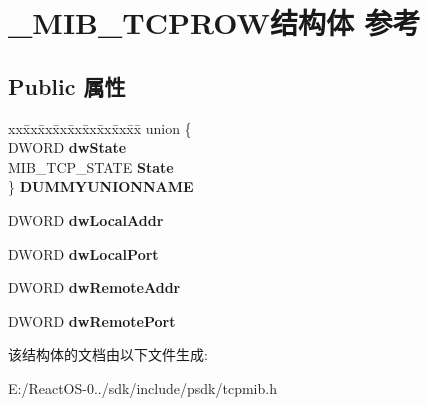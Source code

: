 \hypertarget{struct___m_i_b___t_c_p_r_o_w}{}\section{\+\_\+\+M\+I\+B\+\_\+\+T\+C\+P\+R\+O\+W结构体 参考}
\label{struct___m_i_b___t_c_p_r_o_w}
\subsection*{Public 属性}
\begin{DoxyCompactItemize}
\item 
\mbox{\label{struct___m_i_b___t_c_p_r_o_w_a27cc0d14fdf20faf8d3ce1b8f2ab7068}} 
\begin{tabbing}
xx\=xx\=xx\=xx\=xx\=xx\=xx\=xx\=xx\=\kill
union \{\\
\>DWORD {\bfseries dwState}\\
\>MIB\_TCP\_STATE {\bfseries State}\\
\} {\bfseries DUMMYUNIONNAME}\\

\end{tabbing}\item 
\mbox{\label{struct___m_i_b___t_c_p_r_o_w_a7a7d3f4f24ca85a1f619d1c91adde281}} 
D\+W\+O\+RD {\bfseries dw\+Local\+Addr}
\item 
\mbox{\label{struct___m_i_b___t_c_p_r_o_w_a59f02fad2945a8bf311879cb6b13f12c}} 
D\+W\+O\+RD {\bfseries dw\+Local\+Port}
\item 
\mbox{\label{struct___m_i_b___t_c_p_r_o_w_aa9d4f3d0a660e81ce11f23ff04851683}} 
D\+W\+O\+RD {\bfseries dw\+Remote\+Addr}
\item 
\mbox{\label{struct___m_i_b___t_c_p_r_o_w_a976fc9d9e8eae93ee0b9e7a8c13de149}} 
D\+W\+O\+RD {\bfseries dw\+Remote\+Port}
\end{DoxyCompactItemize}


该结构体的文档由以下文件生成\+:\begin{DoxyCompactItemize}
\item 
E\+:/\+React\+O\+S-\/0../sdk/include/psdk/tcpmib.\+h\end{DoxyCompactItemize}
